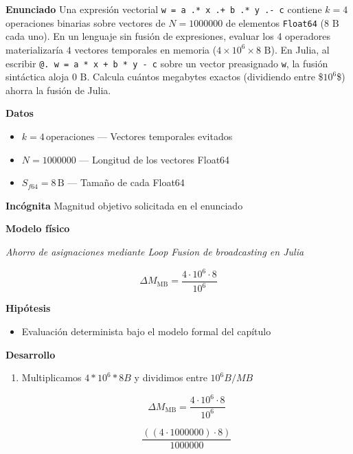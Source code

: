 \documentclass{book}
\begin{document}
\begin{tcolorbox}[title={Problema resuelto}, studiumworked, breakable]

\noindent\textbf{Enunciado}
Una expresión vectorial \texttt{w = a .* x .+ b .* y .- c} contiene \(k = 4\) operaciones binarias sobre vectores de \(N = 1000000\) de elementos \texttt{Float64} (\(8\text{ B}\) cada uno). En un lenguaje sin fusión de expresiones, evaluar los 4 operadores materializaría \(4\) vectores temporales en memoria (\(4 \times 10^6 \times 8\text{ B}\)). En Julia, al escribir \texttt{@. w = a * x + b * y - c} sobre un vector preasignado \texttt{w}, la fusión sintáctica aloja \(0\text{ B}\). Calcula cuántos megabytes exactos (dividiendo entre \$\(10^6\)\$) ahorra la fusión de Julia.

\noindent\textbf{Datos}
\begin{itemize}
\item $k = 4\,\mathrm{operaciones}$ — Vectores temporales evitados
\item $N = 1000000$ — Longitud de los vectores Float64
\item $S_{f64} = 8\,\mathrm{B}$ — Tamaño de cada Float64
\end{itemize}

\noindent\textbf{Incógnita}
Magnitud objetivo solicitada en el enunciado

\noindent\textbf{Modelo físico}

\noindent\textit{Ahorro de asignaciones mediante Loop Fusion de broadcasting en Julia}

\[
\Delta M_{\text{MB}} = \frac{4 \cdot 10^6 \cdot 8}{10^6}
\]

\noindent\textbf{Hipótesis}
\begin{itemize}
\item Evaluación determinista bajo el modelo formal del capítulo
\end{itemize}

\noindent\textbf{Desarrollo}
\begin{enumerate}
\item
Multiplicamos \(4 * 10^6 * 8 B\) y dividimos entre \(10^6 B/MB\)

\[
\Delta M_{\text{MB}} = \frac{4 \cdot 10^6 \cdot 8}{10^6}
\]

\[
\frac{\left(\left(4\cdot 1000000\right)\cdot 8\right)}{1000000}
\]
\end{enumerate}


\end{tcolorbox}
\end{document}
